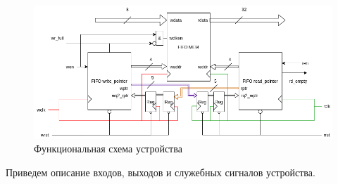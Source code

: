 \begin{figure}
	\centering
	\includegraphics[width=1\linewidth]{course-scheme/images/unit-design}
	\caption{Функциональная схема устройства}
	\label{fig:unit-design}
\end{figure}


Приведем описание входов, выходов и служебных сигналов устройства.


